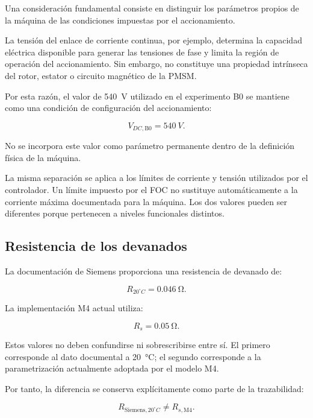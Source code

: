 Una consideración fundamental consiste en distinguir los parámetros propios de la máquina de las condiciones impuestas por el accionamiento.

La tensión del enlace de corriente continua, por ejemplo, determina la capacidad eléctrica disponible para generar las tensiones de fase y limita la región de operación del accionamiento. Sin embargo, no constituye una propiedad intrínseca del rotor, estator o circuito magnético de la PMSM.

Por esta razón, el valor de \SI{540}{V} utilizado en el experimento B0 se mantiene como una condición de configuración del accionamiento:

\begin{equation}
V_{DC,\mathrm{B0}}=\SI{540}{V}.
\end{equation}

No se incorpora este valor como parámetro permanente dentro de la definición física de la máquina.

La misma separación se aplica a los límites de corriente y tensión utilizados por el controlador. Un límite impuesto por el FOC no sustituye automáticamente a la corriente máxima documentada para la máquina. Los dos valores pueden ser diferentes porque pertenecen a niveles funcionales distintos.

\subsection{Resistencia de los devanados}

La documentación de Siemens proporciona una resistencia de devanado de:

\begin{equation}
R_{20^\circ C}=\SI{0.046}{\ohm}.
\end{equation}

La implementación M4 actual utiliza:

\begin{equation}
R_s=\SI{0.05}{\ohm}.
\end{equation}

Estos valores no deben confundirse ni sobrescribirse entre sí. El primero corresponde al dato documental a \SI{20}{\celsius}; el segundo corresponde a la parametrización actualmente adoptada por el modelo M4.

Por tanto, la diferencia se conserva explícitamente como parte de la trazabilidad:

\begin{equation}
R_{\mathrm{Siemens},20^\circ C}
\neq
R_{s,\mathrm{M4}}.
\end{equation}

